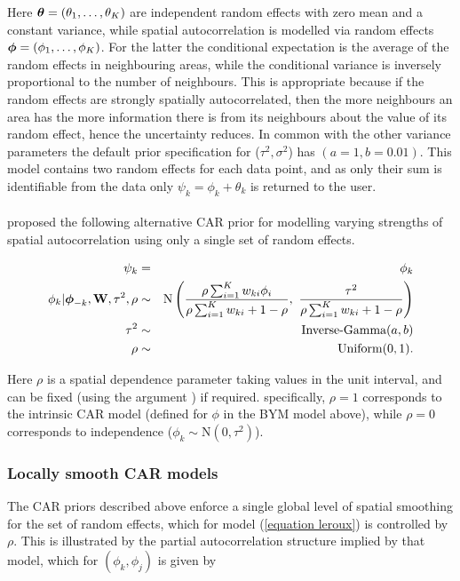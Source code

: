 \documentclass[article,shortnames,nojss]{jss}
\newcommand{\bd}[1]{\ensuremath{\mbox{\boldmath $#1$}}}
\begin{document}
Here $\bd{\theta}=(\theta_{1},\ldots,\theta_{K})$ are independent random effects with zero mean and a constant variance, while spatial autocorrelation is modelled via random effects  $\bd{\phi}=(\phi_{1},\ldots,\phi_{K})$. For the latter the conditional expectation is the average of the random effects in neighbouring areas, while the conditional variance is inversely proportional to the number of neighbours. This is appropriate because if the random effects are strongly spatially autocorrelated, then the more neighbours an area has the more information there is from its neighbours about the value of its random effect, hence the uncertainty reduces. In common with the other variance parameters the default prior specification for ($\tau^{2},\sigma^2$) has $(a=1, b=0.01)$. This model contains two random effects for each data point, and as only their sum is identifiable from the data only $\psi_k=\phi_k+\theta_k$ is returned to the user.\\

\\
\cite{leroux2000} proposed the following alternative CAR prior for modelling varying strengths of spatial autocorrelation using only a single set of random effects.

\begin{eqnarray}
\psi_k&=&\phi_k\label{equation leroux}\\
\phi_{k}| \bd{\phi}_{-k},\mathbf{W},\tau^2, \rho&\sim&\mbox{N}\left(\frac{\rho\sum_{i=1}^{K}w_{ki}\phi_{i}}{\rho\sum_{i=1}^{K}w_{ki} + 1-\rho},~
\frac{\tau^{2}}{\rho\sum_{i=1}^{K}w_{ki} + 1-\rho}\right)\nonumber\\
\tau^{2}&\sim&\mbox{Inverse-Gamma}(a, b)\nonumber\\
\rho&\sim&\mbox{Uniform}(0,1).\nonumber
\end{eqnarray}

Here $\rho$ is a spatial dependence parameter taking values in the unit interval, and can be fixed (using the argument ) if required. specifically, $\rho=1$ corresponds to  the intrinsic CAR model (defined for $\phi$ in the BYM model above), while $\rho=0$ corresponds to independence ($\phi_k\sim\mbox{N}(0, \tau^2)$).


\subsubsection{Locally smooth CAR models}
The CAR priors described above enforce a single global level of spatial smoothing for the set of random effects, which for model (\ref{equation leroux}) is controlled by $\rho$. This is illustrated by the partial autocorrelation structure implied by that model, which for $(\phi_k, \phi_j)$ is given by
\end{document}
